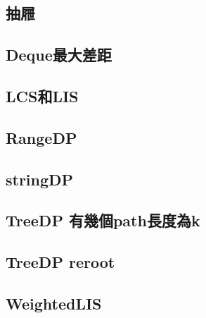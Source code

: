     \subsection{抽屜}
        
    \subsection{Deque最大差距}
        
    \subsection{LCS和LIS}
        
    \subsection{RangeDP}
        
    \subsection{stringDP}
        
    \subsection{TreeDP 有幾個path長度為k}
        
    \subsection{TreeDP reroot}
        
    \subsection{WeightedLIS}
        
    

%         